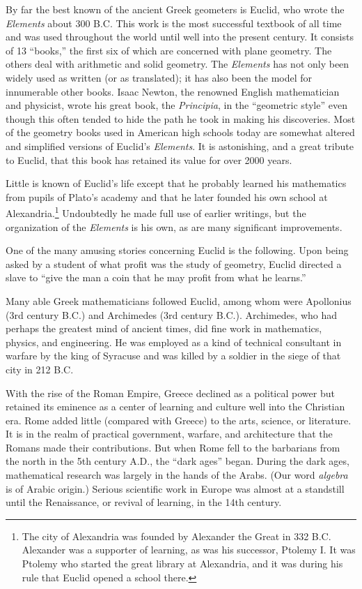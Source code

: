 \documentclass[11pt]{book}
\begin{document}
By far the best known of the ancient Greek geometers is Euclid, who wrote the
\emph{Elements} about 300 B.C. This work is the most successful textbook of all
time and was used throughout the world until well into the present century. It
consists of 13 ``books,'' the first six of which are concerned with plane
geometry. The others deal with arithmetic and solid geometry. The
\emph{Elements} has not only been widely used as written (or as translated); it
has also been the model for innumerable other books. Isaac Newton, the renowned
English mathematician and physicist, wrote his great book, the \emph{Principia},
in the ``geometric style'' even though this often tended to hide the path he took
in making his discoveries. Most of the geometry books used in American high
schools today are somewhat altered and simplified versions of Euclid's
\emph{Elements}. It is astonishing, and a great tribute to Euclid, that this
book has retained its value for over 2000 years.

Little is known of Euclid's life except that he probably learned his mathematics
from pupils of Plato's academy and that he later founded his own school at
Alexandria.\footnote{The city of Alexandria was founded by Alexander the Great in
332 B.C. Alexander was a supporter of learning, as was his successor, Ptolemy I.
It was Ptolemy who started the great library at Alexandria, and it was during his
rule that Euclid opened a school there.}
Undoubtedly he made full use of earlier writings, but the organization of the
\emph{Elements} is his own, as are many significant improvements.

One of the many amusing stories concerning Euclid is the following. Upon being
asked by a student of what profit was the study of geometry, Euclid directed a
slave to ``give the man a coin that he may profit from what he learns.''

\setcounter{footnote}{0}
Many able Greek mathematicians followed Euclid, among whom were Apollonius (3rd
century B.C.) and Archimedes (3rd century B.C.). Archimedes, who had perhaps the
greatest mind of ancient times, did fine work in mathematics, physics, and
engineering. He was employed as a kind of technical consultant in warfare by the
king of Syracuse and was killed by a soldier in the siege of that city in 212
B.C.

With the rise of the Roman Empire, Greece declined as a political power but
retained its eminence as a center of learning and culture well into the Christian
era. Rome added little (compared with Greece) to the arts, science, or
literature. It is in the realm of practical government, warfare, and architecture
that the Romans made their contributions. But when Rome fell to the barbarians
from the north in the 5th century A.D., the ``dark ages'' began. During the dark
ages, mathematical research was largely in the hands of the Arabs. (Our word
\emph{algebra} is of Arabic origin.) Serious scientific work in Europe was almost
at a standstill until the Renaissance, or revival of learning, in the 14th
century.
\end{document}

